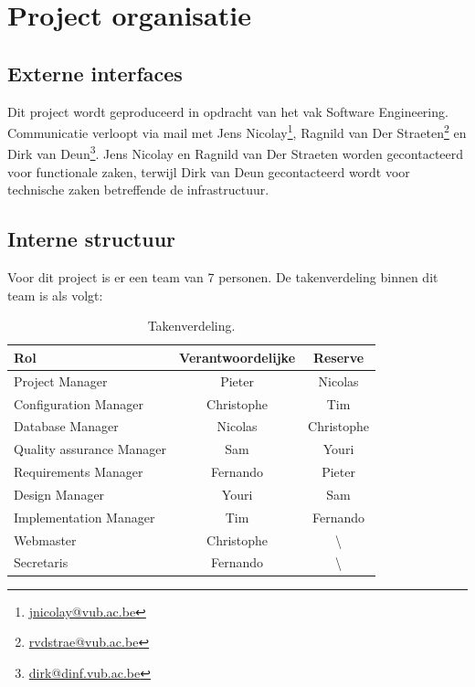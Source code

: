 \chapter{Project organisatie} \label{chap:ProjectOrganisatie}
\section{Externe interfaces}
Dit project wordt geproduceerd in opdracht van het vak Software Engineering. Communicatie verloopt via mail met Jens Nicolay\footnote{\href{mailto:jnicolay@vub.ac.be}{jnicolay@vub.ac.be}}, Ragnild van Der Straeten\footnote{\href{mailto:rvdstrae@vub.ac.be}{rvdstrae@vub.ac.be}} en Dirk van Deun\footnote{\href{mailto:dirk@dinf.vub.ac.be}{dirk@dinf.vub.ac.be}}. Jens Nicolay en Ragnild van Der Straeten worden gecontacteerd voor functionale zaken, terwijl Dirk van Deun gecontacteerd wordt voor technische zaken betreffende de infrastructuur.

\section{Interne structuur} \label{sec:InterneStructuur}
Voor dit project is er een team van 7 personen. De takenverdeling binnen dit team is als volgt:
\begin{table} [H]
	\centering
	\caption{Takenverdeling.}
	\begin{tabular} {l|cc}
		Rol & Verantwoordelijke & Reserve \\
		\hline
		Project Manager & Pieter & Nicolas \\
		Configuration Manager & Christophe & Tim \\
		Database Manager & Nicolas & Christophe \\
		Quality assurance Manager & Sam & Youri \\
		Requirements Manager & Fernando & Pieter \\
		Design Manager & Youri & Sam \\
		Implementation Manager & Tim & Fernando \\
		\hline
		Webmaster & Christophe & \textbackslash \\
		Secretaris & Fernando & \textbackslash 
	\end{tabular}
	\label{tab:takenverdeling}
\end{table}

